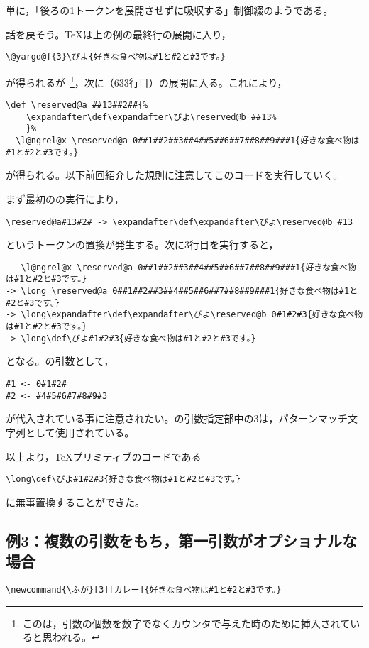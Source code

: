 \documentclass[autodetect-engine,dvipdfmx]{jsarticle}
\begin{document}
単に，「後ろの1トークンを展開させずに吸収する」制御綴のようである。

話を戻そう。\TeX は上の例の最終行の展開に入り，
\texsource
\begin{lstlisting}
\@yargd@f{3}\ぴよ{好きな食べ物は#1と#2と#3です。}
\end{lstlisting}

が得られるが\ \footnote{このは，引数の個数を数字でなくカウンタで与えた時のために挿入されていると思われる。}，次に（633行目）の展開に入る。これにより，
\begin{lstlisting}
\def \reserved@a ##13##2##{%
    \expandafter\def\expandafter\ぴよ\reserved@b ##13%
    }%
  \l@ngrel@x \reserved@a 0##1##2##3##4##5##6##7##8##9###1{好きな食べ物は#1と#2と#3です。}
\end{lstlisting}
が得られる。以下前回紹介した規則に注意してこのコードを実行していく。

まず最初のの実行により，
\begin{lstlisting}
\reserved@a#13#2# -> \expandafter\def\expandafter\ぴよ\reserved@b #13
\end{lstlisting}
というトークンの置換が発生する。次に3行目を実行すると，
\begin{lstlisting}
   \l@ngrel@x \reserved@a 0##1##2##3##4##5##6##7##8##9###1{好きな食べ物は#1と#2と#3です。}
-> \long \reserved@a 0##1##2##3##4##5##6##7##8##9###1{好きな食べ物は#1と#2と#3です。}
-> \long\expandafter\def\expandafter\ぴよ\reserved@b 0#1#2#3{好きな食べ物は#1と#2と#3です。}
-> \long\def\ぴよ#1#2#3{好きな食べ物は#1と#2と#3です。}
\end{lstlisting}
となる。の引数として，
\begin{lstlisting}
#1 <- 0#1#2#
#2 <- #4#5#6#7#8#9#3
\end{lstlisting}
が代入されている事に注意されたい。の引数指定部中の3は，パターンマッチ文字列として使用されている。

以上より，\TeX プリミティブのコードである
\begin{lstlisting}
\long\def\ぴよ#1#2#3{好きな食べ物は#1と#2と#3です。}
\end{lstlisting}
に無事置換することができた。

\subsection{例3：複数の引数をもち，第一引数がオプショナルな場合}

\begin{lstlisting}
\newcommand{\ふが}[3][カレー]{好きな食べ物は#1と#2と#3です。}
\end{lstlisting}
\end{document}
